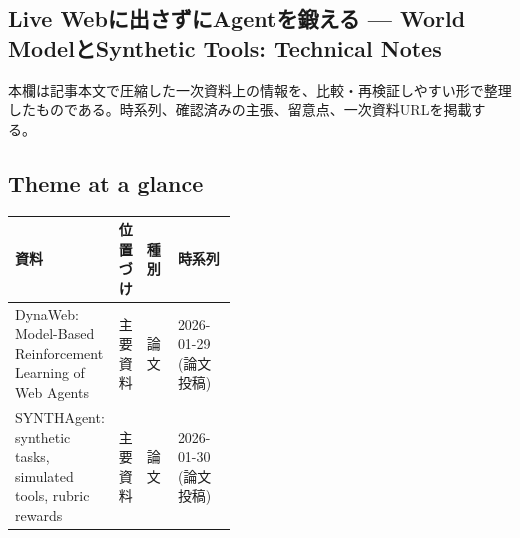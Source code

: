 \subsection*{Live Webに出さずにAgentを鍛える — World ModelとSynthetic Tools: Technical Notes}
本欄は記事本文で圧縮した一次資料上の情報を、比較・再検証しやすい形で整理したものである。時系列、確認済みの主張、留意点、一次資料URLを掲載する。
\medskip
\subsection*{Theme at a glance}
\begin{center}
\footnotesize
\begin{tabularx}{\linewidth}{@{}p{0.20\linewidth}p{0.10\linewidth}p{0.14\linewidth}X@{}}
\toprule
資料 & 位置づけ & 種別 & 時系列 \\
\midrule
DynaWeb: Model-Based Reinforcement Learning of Web Agents & 主要資料 & 論文 & 2026-01-29 (論文投稿) \\
SYNTHAgent: synthetic tasks, simulated tools, rubric rewards & 主要資料 & 論文 & 2026-01-30 (論文投稿) \\
\bottomrule
\end{tabularx}
\end{center}
\normalsize

